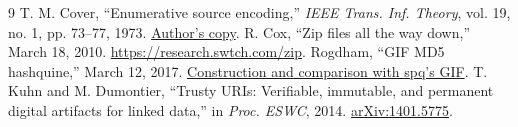\documentclass[10pt,twocolumn,letterpaper]{article}
\begin{document}
\begin{thebibliography}{9}\small
{} T. M. Cover, ``Enumerative source encoding,'' \emph{IEEE Trans. Inf. Theory}, vol. 19, no. 1, pp. 73--77, 1973. \href{https://isl.stanford.edu/~cover/papers/transIT/0073cove.pdf}{Author's copy}.
 R. Cox, ``Zip files all the way down,'' March 18, 2010. \url{https://research.swtch.com/zip}.
 Rogdham, ``GIF MD5 hashquine,'' March 12, 2017. \href{https://www.rogdham.net/2017/03/12/gif-md5-hashquine.en}{Construction and comparison with spq's GIF}.
 T. Kuhn and M. Dumontier, ``Trusty URIs: Verifiable, immutable, and permanent digital artifacts for linked data,'' in \emph{Proc. ESWC}, 2014. \href{https://arxiv.org/abs/1401.5775}{arXiv:1401.5775}.
\end{thebibliography}
\end{document}
